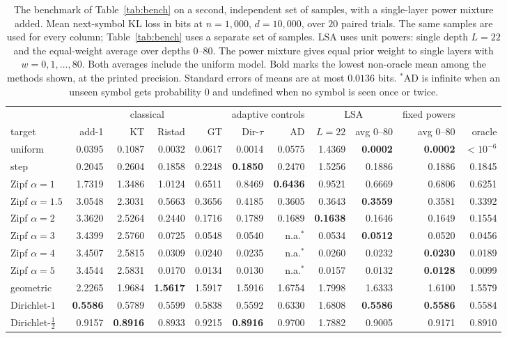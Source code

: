 \documentclass[anon]{alt2027}
\begin{document}
\begin{table}[t]
\centering
\caption{The benchmark of Table~\ref{tab:bench} on a second, independent set of samples, with a single-layer power mixture added. Mean next-symbol KL loss in bits at $n=1{,}000$, $d=10{,}000$, over $20$ paired trials. The same samples are used for every column; Table~\ref{tab:bench} uses a separate set of samples. LSA uses unit powers: single depth $L=22$ and the equal-weight average over depths $0$--$80$. The power mixture gives equal prior weight to single layers with $w=0,1,\ldots,80$. Both averages include the uniform model. Bold marks the lowest non-oracle mean among the methods shown, at the printed precision. Standard errors of means are at most $0.0136$ bits. $^{*}$AD is infinite when an unseen symbol gets probability $0$ and undefined when no symbol is seen once or twice.}
\label{tab:powers-bench}
\footnotesize\setlength{\tabcolsep}{3pt}
\begin{tabular}{lrrrr|rr|rr|r|r}
\toprule
& \multicolumn{4}{c|}{classical} & \multicolumn{2}{c|}{adaptive controls} & \multicolumn{2}{c|}{LSA} & fixed powers & \\
target & add-1 & KT & Ristad & GT & Dir-$\tau$ & AD & $L=22$ & avg $0$--$80$ & avg $0$--$80$ & oracle\\
\midrule
uniform & 0.0395 & 0.1087 & 0.0032 & 0.0617 & 0.0014 & 0.0575 & 1.4369 & \textbf{0.0002} & \textbf{0.0002} & $<10^{-6}$\\
step & 0.2045 & 0.2604 & 0.1858 & 0.2248 & \textbf{0.1850} & 0.2470 & 1.5256 & 0.1886 & 0.1886 & 0.1845\\
Zipf $\alpha=1$ & 1.7319 & 1.3486 & 1.0124 & 0.6511 & 0.8469 & \textbf{0.6436} & 0.9521 & 0.6669 & 0.6806 & 0.6251\\
Zipf $\alpha=1.5$ & 3.0548 & 2.3031 & 0.5663 & 0.3656 & 0.4185 & 0.3605 & 0.3643 & \textbf{0.3559} & 0.3581 & 0.3392\\
Zipf $\alpha=2$ & 3.3620 & 2.5264 & 0.2440 & 0.1716 & 0.1789 & 0.1689 & \textbf{0.1638} & 0.1646 & 0.1649 & 0.1554\\
Zipf $\alpha=3$ & 3.4399 & 2.5760 & 0.0725 & 0.0548 & 0.0540 & n.a.$^{*}$ & 0.0534 & \textbf{0.0512} & 0.0520 & 0.0456\\
Zipf $\alpha=4$ & 3.4507 & 2.5815 & 0.0309 & 0.0240 & 0.0235 & n.a.$^{*}$ & 0.0260 & 0.0232 & \textbf{0.0230} & 0.0189\\
Zipf $\alpha=5$ & 3.4544 & 2.5831 & 0.0170 & 0.0134 & 0.0130 & n.a.$^{*}$ & 0.0157 & 0.0132 & \textbf{0.0128} & 0.0099\\
geometric & 2.2265 & 1.9684 & \textbf{1.5617} & 1.5917 & 1.5916 & 1.6754 & 1.7998 & 1.6333 & 1.6100 & 1.5579\\
Dirichlet-$1$ & \textbf{0.5586} & 0.5789 & 0.5599 & 0.5838 & 0.5592 & 0.6330 & 1.6808 & \textbf{0.5586} & \textbf{0.5586} & 0.5584\\
Dirichlet-$\frac12$ & 0.9157 & \textbf{0.8916} & 0.8933 & 0.9215 & \textbf{0.8916} & 0.9700 & 1.7882 & 0.9005 & 0.9171 & 0.8910\\
\bottomrule
\end{tabular}
\end{table}
\end{document}

